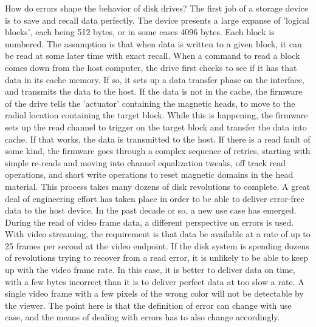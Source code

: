 \documentclass[
	a4paper, %
	10pt, %
	unnumberedsections, %
	twoside, %
]{LTJournalArticle}
\begin{document}
How do errors shape the behavior of disk drives? The first job of a storage device is to save and
recall data perfectly. The device presents a large expanse of 'logical blocks', each being 512 bytes, or 
in some cases 4096 bytes. Each block is numbered. The assumption is that when data is written to 
a given block, it can be read at some later time with exact recall. When a command to read a block
comes down from the host computer, the drive first checks to see if it has that data in its cache 
memory. If so, it sets up a data transfer phase on the interface, and transmits the data to the host. 
If the data is not in the cache, the firmware of the drive tells the 'actuator' containing the 
magnetic heads, to move to the radial location containing the target block. While this is happening,
the firmware sets up the read channel to trigger on the target block and transfer the data into 
cache. If that works, the data is transmitted to the host. If there is a read fault of some kind, 
the firmware goes through a complex sequence of retries, starting with simple re-reads and moving 
into channel equalization tweaks, off track read operations, and short write operations to reset 
magnetic domains in the head material. This process takes many dozens of disk revolutions to 
complete. A great deal of engineering effort has taken place in order to be able to deliver error-free
data to the host device. In the past decade or so, a new use case has emerged. During the read of 
video frame data, a different perspective on errors is used. With video 
streaming, the requirement is that data be available at a rate of up to 25 frames per second at 
the video endpoint. If the disk system is spending dozens of revolutions trying to recover from 
a read error, it is unlikely to be able to keep up with the video frame rate. In this case, it is 
better to deliver data on time, with a few bytes incorrect than it is to deliver perfect data 
at too slow a rate. A single video frame with a few pixels of the wrong color will not be detectable 
by the viewer. The point here is that the definition of error can change with use case, and the
means of dealing with errors has to also change accordingly. 
 
\end{document}
